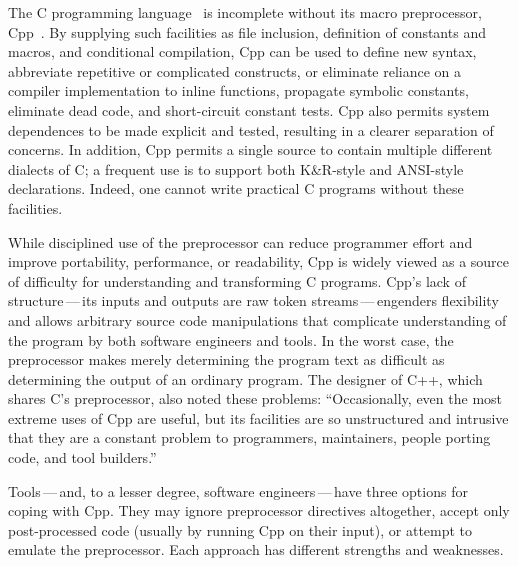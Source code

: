 \documentclass[10pt]{article}
\begin{document}
The C programming language~\cite{ansi} is incomplete without its macro
preprocessor, Cpp~\cite[Ch.~3]{Harbison91}. By supplying such
facilities as file inclusion, definition of constants and macros, and
conditional compilation, Cpp can be used to define new syntax,
abbreviate repetitive or complicated constructs, or eliminate reliance
on a compiler implementation to inline functions, propagate symbolic
constants, eliminate dead code, and short-circuit constant tests.  Cpp
also permits system dependences to be made explicit and tested,
resulting in a clearer separation of concerns.  In addition, Cpp
permits a single source to contain multiple different dialects of C; a
frequent use is to support both K\&R-style and ANSI-style
declarations.  Indeed, one cannot write practical C programs without
these facilities.

While disciplined use of the preprocessor can reduce programmer effort
and improve portability, performance, or readability, Cpp is widely
viewed as a source of difficulty for understanding and transforming C
programs.  Cpp's lack of structure\,---\,its inputs and
outputs are raw token streams\,---\,engenders flexibility and allows
arbitrary source code manipulations that complicate 
understanding of the program by both software engineers and tools.  In
the worst case, the preprocessor makes merely determining the program
text as difficult as determining the output of an ordinary program.
The designer of C++, which shares C's preprocessor, also noted these
problems: ``Occasionally, even the most extreme uses of Cpp are
useful, but its facilities are so unstructured and intrusive that they
are a constant problem to programmers, maintainers, people porting
code, and tool builders.''~\cite[p.~424]{Stroustrup-DesignEvolution}

Tools\,---\,and, to a lesser degree, software engineers\,---\,have
three options for coping with Cpp.  They may ignore preprocessor
directives altogether, accept only post-processed code (usually by
running Cpp on their input), or attempt to emulate the preprocessor.
Each approach has different strengths and weaknesses.
\end{document}
